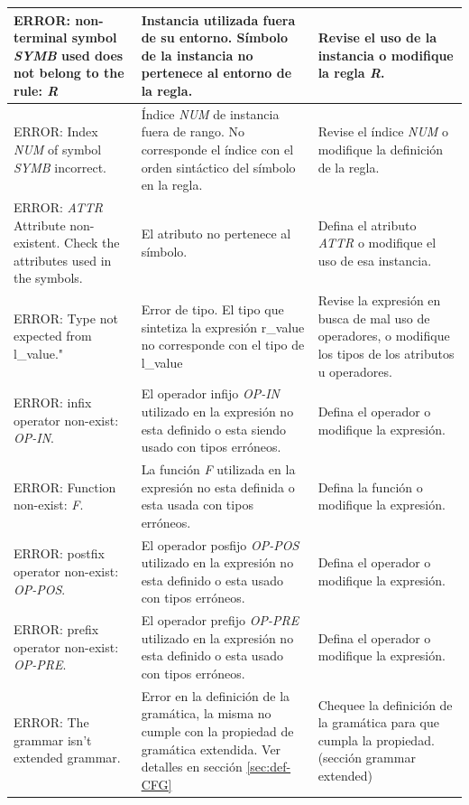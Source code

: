 \begin{small}
\begin{longtable}{| p{4.5cm} || p{4.5cm} | p{4.5cm} |}
ERROR: non-terminal symbol \textit{SYMB} used does not belong to the rule: \textit{R} & Instancia utilizada fuera de su entorno. Símbolo de la instancia no pertenece al entorno de la regla. & Revise el uso de la instancia o modifique la regla \textit{R}.  \\ \hline

ERROR: Index \textit{NUM} of symbol  \textit{SYMB} incorrect. & Índice \textit{NUM} de instancia fuera de rango. No corresponde el índice con el orden sintáctico del símbolo en la regla. & Revise el índice \textit{NUM} o modifique la definición de la regla.  \\ \hline 

ERROR: \textit{ATTR} Attribute non-existent. Check the attributes used in the symbols. & El atributo no pertenece al símbolo. & Defina el atributo \textit{ATTR} o modifique el uso de esa instancia. \\ \hline

ERROR: Type not expected from l\_value." & Error de tipo. El tipo que sintetiza la expresión r\_value no corresponde con el tipo de l\_value & Revise la expresión en busca de mal uso de operadores, o modifique los tipos de los atributos u operadores. \\ \hline
 
ERROR: infix operator non-exist: \textit{OP-IN}. & El operador infijo \textit{OP-IN} utilizado en la expresión no esta definido o esta siendo usado con tipos erróneos. & Defina el operador o modifique la expresión. \\ \hline
 
ERROR: Function non-exist: \textit{F}. & La función \textit{F} utilizada en la expresión no esta definida o esta usada con tipos erróneos. & Defina la función o modifique la expresión. \\ \hline
 
ERROR: postfix operator non-exist: \textit{OP-POS}. & El operador posfijo \textit{OP-POS} utilizado en la expresión no esta definido o esta usado con tipos erróneos. & Defina el operador o modifique la expresión. \\ \hline 

ERROR: prefix operator non-exist: \textit{OP-PRE}. & El operador prefijo \textit{OP-PRE} utilizado en la expresión no esta definido o esta usado con tipos erróneos. & Defina el operador o modifique la expresión. \\ \hline 

ERROR: The grammar isn't extended grammar. & Error en la definición de la gramática, la misma no cumple con la propiedad de gramática extendida. Ver detalles en sección \ref{sec:def-CFG} & Chequee la definición de la gramática para que cumpla la propiedad.(sección grammar extended) \\ \hline


\end{longtable}
\end{small}
